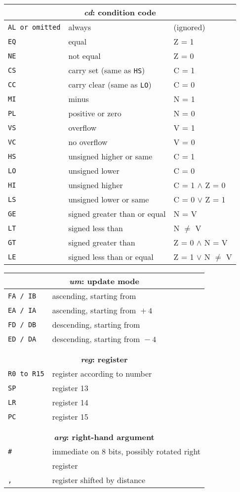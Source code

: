 \documentclass[a4paper,twoside,10pt]{article}
\begin{document}
	\def\code#1#2#3{\texttt{#1} & \small #2 & #3\\}
	
	
	\begin{table}[p!]\centering
				
		
		\begin{tabular}{l@{\hspace{5mm}}ll}
			\multicolumn{3}{c}{\bfseries \emph{cd}: condition code} \\
			\hline
				\code{AL \textrm{or omitted}}{always}{(ignored)}
				\code{EQ}{equal}{Z = 1}
				\code{NE}{not equal}{Z = 0}
				\code{CS}{carry set (same as \texttt{HS})}{C = 1}
				\code{CC}{carry clear (same as \texttt{LO})}{C = 0}
				\code{MI}{minus}{N = 1}
				\code{PL}{positive or zero}{N = 0}
				\code{VS}{overflow}{V = 1}
				\code{VC}{no overflow}{V = 0}
				\code{HS}{unsigned higher or same}{C = 1}
				\code{LO}{unsigned lower}{C = 0}
				\code{HI}{unsigned higher}{C = 1 $\wedge$ Z = 0}
				\code{LS}{unsigned lower or same}{C = 0 $\vee$ Z = 1}
				\code{GE}{signed greater than or equal}{N = V}
				\code{LT}{signed less than}{N $\neq$ V}
				\code{GT}{signed greater than}{Z = 0 $\wedge$ N = V}
				\code{LE}{signed less than or equal}{Z = 1 $\vee$ N $\neq$ V}\hline
				
		\end{tabular}
		\hfill
		\def\code#1#2{\texttt{#1} &\small #2 \\}
		\begin{tabular}{l@{\hspace{5mm}}l}
			\multicolumn{2}{c}{\bfseries \emph{um}: update mode} \\
			\hline
			\code{FA / IB}{ascending, starting from \reg}
			\code{EA / IA}{ascending, starting from \reg ${}+{} 4$}
			\code{FD / DB}{descending, starting from \reg}
			\code{ED / DA}{descending, starting from \reg ${}- 4$}\hline
			&\\
			&\\
			\multicolumn{2}{c}{\bfseries \emph{reg}: register} \\
			\hline
			\code{R0 \textrm{to} R15}{register according to number}
			\code{SP}{register 13}
			\code{LR}{register 14}
			\code{PC}{register 15}\hline
			&\\
			&\\
			\multicolumn{2}{c}{\bfseries \emph{arg}: right-hand argument} \\
			\hline
			\code{\#\imm[8]}{immediate on 8 bits, possibly rotated right}
			\code{\reg}{register}
			\code{\reg, \shift}{register shifted by distance}\hline
		\end{tabular}
				
	\end{table}
	
\end{document}
